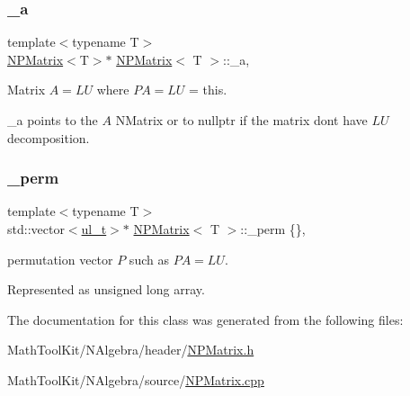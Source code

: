 \subsubsection{\texorpdfstring{\_a}{\_a}}
{\footnotesize\ttfamily template$<$typename T$>$ \\
\mbox{\hyperlink{class_n_p_matrix}{N\+P\+Matrix}}$<$T$>$$\ast$ \mbox{\hyperlink{class_n_p_matrix}{N\+P\+Matrix}}$<$ T $>$\+::\+\_\+a\hspace{0.3cm}{\ttfamily [mutable]}, {\ttfamily [protected]}}



Matrix $ A = LU $ where $ PA = LU $ = this. 

{\ttfamily \+\_\+a} points to the $ A $ N\+Matrix or to {\ttfamily nullptr} if the matrix don\textquotesingle{}t have $ LU $ decomposition. \mbox{\label{class_n_p_matrix_adae969b094e97895a62412765b50fb6f}} 
\subsubsection{\texorpdfstring{\_perm}{\_perm}}
{\footnotesize\ttfamily template$<$typename T$>$ \\
std\+::vector$<$\mbox{\hyperlink{typedef_8h_a1b140a2034db3f5dfe18a987745df43a}{ul\+\_\+t}}$>$$\ast$ \mbox{\hyperlink{class_n_p_matrix}{N\+P\+Matrix}}$<$ T $>$\+::\+\_\+perm \{\}\hspace{0.3cm}{\ttfamily [mutable]}, {\ttfamily [protected]}}



permutation vector $ P $ such as $ PA = LU $. 

Represented as {\ttfamily unsigned long} array. 

The documentation for this class was generated from the following files\+:\begin{DoxyCompactItemize}
\item 
Math\+Tool\+Kit/\+N\+Algebra/header/\mbox{\hyperlink{_n_p_matrix_8h}{N\+P\+Matrix.\+h}}\item 
Math\+Tool\+Kit/\+N\+Algebra/source/\mbox{\hyperlink{_n_p_matrix_8cpp}{N\+P\+Matrix.\+cpp}}\end{DoxyCompactItemize}
